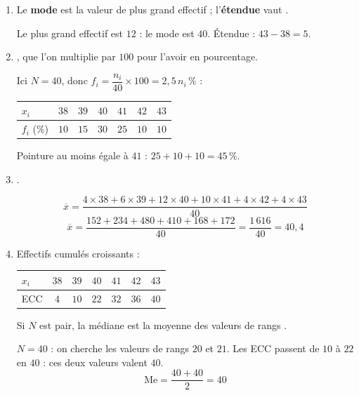 \begin{enumerate}[itemsep=14pt]
  \item
  \begin{prop}
  Le \textbf{mode} est la valeur de plus grand effectif ; l'\textbf{étendue} vaut .
  \end{prop}
  Le plus grand effectif est $12$ : le mode est $40$. \qquad Étendue : $43-38=5$.

  \item
  \begin{prop}[Fréquence]
  , que l'on multiplie par $100$ pour l'avoir en pourcentage.
  \end{prop}
  Ici $N=40$, donc $f_i=\dfrac{n_i}{40}\times100=2{,}5\,n_i\,\%$ :
  \begin{center}
  \begin{tabular}{|l|c|c|c|c|c|c|}\hline
  $x_i$ & $38$ & $39$ & $40$ & $41$ & $42$ & $43$ \\\hline
  $f_i$ (\%) & $10$ & $15$ & $30$ & $25$ & $10$ & $10$ \\\hline
  \end{tabular}\end{center}
  Pointure au moins égale à $41$ : $25+10+10=45\,\%$.

  \item
  \begin{prop}[Moyenne]
  .
  \end{prop}
  \[\overline x=\dfrac{4\times38+6\times39+12\times40+10\times41+4\times42+4\times43}{40}\]
  \[\overline x=\dfrac{152+234+480+410+168+172}{40}=\dfrac{1\,616}{40}=40{,}4\]

  \item Effectifs cumulés croissants :
  \begin{center}
  \begin{tabular}{|l|c|c|c|c|c|c|}\hline
  $x_i$ & $38$ & $39$ & $40$ & $41$ & $42$ & $43$ \\\hline
  ECC & $4$ & $10$ & $22$ & $32$ & $36$ & $40$ \\\hline
  \end{tabular}\end{center}
  \begin{prop}
  Si $N$ est pair, la médiane est la moyenne des valeurs de rangs .
  \end{prop}
  $N=40$ : on cherche les valeurs de rangs $20$ et $21$. Les ECC passent de $10$ à $22$ en $40$ : ces deux valeurs valent $40$.
  \[\text{Me}=\dfrac{40+40}{2}=40\]
\end{enumerate}
